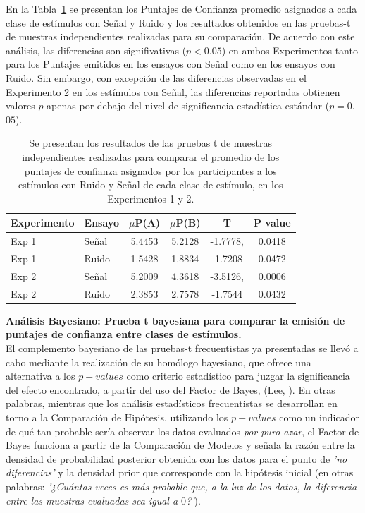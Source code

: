 En la Tabla~\ref{Tabla_t-Confidence} se presentan los Puntajes de Confianza promedio asignados a cada clase de estímulos con Señal y Ruido y los resultados obtenidos en las pruebas-t de muestras independientes realizadas para su comparación. De acuerdo con este análisis, las diferencias son signifivativas ($p<0.05$) en ambos Experimentos tanto para los Puntajes emitidos  en los ensayos con Señal como en los ensayos con Ruido. Sin embargo, con excepción de las diferencias observadas en el Experimento 2 en los estímulos con Señal, las diferencias reportadas obtienen valores $p$ apenas por debajo del nivel de significancia estadística estándar ($p=0$.$05$).\\

\begin{table}
\caption[Prueba T para evaluar diferencias en las medias de los puntajes de confianza asigandos entre condiciones]{Se presentan los resultados de las pruebas t de muestras independientes realizadas para comparar el promedio de los puntajes de confianza asignados por los participantes a los estímulos con Ruido y Señal de cada clase de estímulo, en los Experimentos 1 y 2.}
\label{Tabla_t-Confidence}
\centering
\begin{tabular}{l l |  c c c c}
\toprule
\textbf{Experimento} & \textbf{Ensayo} & \textbf{$\mu$P(A)} & \textbf{$\mu$P(B)} & \textbf{T} & \textbf{P value}\\
\midrule
Exp 1 & Señal & 5.4453 & 5.2128 & -1.7778, & 0.0418 \\
Exp 1 & Ruido & 1.5428 & 1.8834 & -1.7208 & 0.0472 \\
Exp 2 & Señal & 5.2009 & 4.3618  & -3.5126, & 0.0006 \\
Exp 2 & Ruido & 2.3853 & 2.7578 & -1.7544 & 0.0432 \\
\bottomrule
\end{tabular}
\end{table}

\textbf{Análisis Bayesiano: Prueba t bayesiana para comparar la emisión de puntajes de confianza entre clases de estímulos.}\\

El complemento bayesiano de las pruebas-t frecuentistas ya presentadas se llevó a cabo mediante la realización de su homólogo bayesiano, que ofrece una alternativa a los $p-values$ como criterio estadístico para juzgar la significancia del efecto encontrado, a partir del uso del Factor de Bayes, (Lee, \citeyear{Lee2016}). En otras palabras, mientras que los análisis estadísticos frecuentistas se desarrollan en torno a la Comparación de Hipótesis, utilizando los $p-values$ como un indicador de qué tan probable sería observar los datos evaluados \textit{por puro azar}, el Factor de Bayes funciona a partir de la Comparación de Modelos y señala la razón entre la densidad de probabilidad posterior obtenida con los datos para el punto de \textit{'no diferencias'} y la densidad prior que corresponde con la hipótesis inicial (en otras palabras: \textit{'¿Cuántas veces es más probable que, a la luz de los datos, la diferencia entre las muestras evaluadas sea igual a $0$?'}).\\

